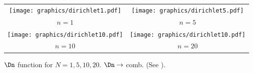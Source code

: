 \begin{figure}
  \centering
  \begin{tabular}{cc}
    \texttt{[image: graphics/dirichlet1.pdf]}&\texttt{[image: graphics/dirichlet5.pdf]}\\
    $n=1$&$n=5$\\
    \texttt{[image: graphics/dirichlet10.pdf]}&\texttt{[image: graphics/dirichlet10.pdf]}\\
    $n=10$&$n=20$
  \end{tabular}
    \caption{
       $\Dn$ function for $N=1,5,10,20$.
       $\Dn\to$ comb.
       (See ).
       \label{fig:DN}
       }
\end{figure}
%
